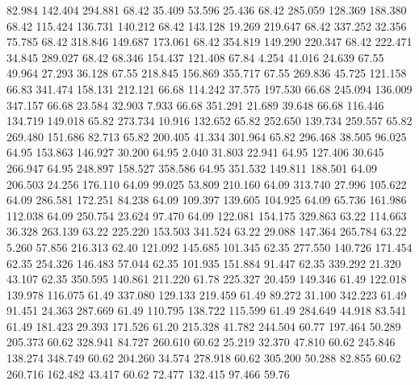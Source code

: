  82.984  142.404  294.881        68.42
  35.409   53.596   25.436        68.42
 285.059  128.369  188.380        68.42
 115.424  136.731  140.212        68.42
 143.128   19.269  219.647        68.42
 337.252   32.356   75.785        68.42
 318.846  149.687  173.061        68.42
 354.819  149.290  220.347        68.42
 222.471   34.845  289.027        68.42
  68.346  154.437  121.408        67.84
   4.254   41.016   24.639        67.55
  49.964   27.293   36.128        67.55
 218.845  156.869  355.717        67.55
 269.836   45.725  121.158        66.83
 341.474  158.131  212.121        66.68
 114.242   37.575  197.530        66.68
 245.094  136.009  347.157        66.68
  23.584   32.903    7.933        66.68
 351.291   21.689   39.648        66.68
 116.446  134.719  149.018        65.82
 273.734   10.916  132.652        65.82
 252.650  139.734  259.557        65.82
 269.480  151.686   82.713        65.82
 200.405   41.334  301.964        65.82
 296.468   38.505   96.025        64.95
 153.863  146.927   30.200        64.95
   2.040   31.803   22.941        64.95
 127.406   30.645  266.947        64.95
 248.897  158.527  358.586        64.95
 351.532  149.811  188.501        64.09
 206.503   24.256  176.110        64.09
  99.025   53.809  210.160        64.09
 313.740   27.996  105.622        64.09
 286.581  172.251   84.238        64.09
 109.397  139.605  104.925        64.09
  65.736  161.986  112.038        64.09
 250.754   23.624   97.470        64.09
 122.081  154.175  329.863        63.22
 114.663   36.328  263.139        63.22
 225.220  153.503  341.524        63.22
  29.088  147.364  265.784        63.22
   5.260   57.856  216.313        62.40
 121.092  145.685  101.345        62.35
 277.550  140.726  171.454        62.35
 254.326  146.483   57.044        62.35
 101.935  151.884   91.447        62.35
 339.292   21.320   43.107        62.35
 350.595  140.861  211.220        61.78
 225.327   20.459  149.346        61.49
 122.018  139.978  116.075        61.49
 337.080  129.133  219.459        61.49
  89.272   31.100  342.223        61.49
  91.451   24.363  287.669        61.49
 110.795  138.722  115.599        61.49
 284.649   44.918   83.541        61.49
 181.423   29.393  171.526        61.20
 215.328   41.782  244.504        60.77
 197.464   50.289  205.373        60.62
 328.941   84.727  260.610        60.62
  25.219   32.370   47.810        60.62
 245.846  138.274  348.749        60.62
 204.260   34.574  278.918        60.62
 305.200   50.288   82.855        60.62
 260.716  162.482   43.417        60.62
  72.477  132.415   97.466        59.76
